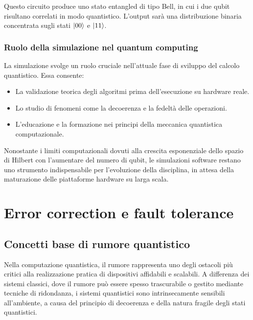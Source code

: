 \documentclass[a4paper,12pt]{report}
\theoremstyle{plain}
\begin{document}
Questo circuito produce uno stato entangled di tipo Bell, in cui i due qubit risultano correlati in modo quantistico. L'output sarà una distribuzione binaria concentrata sugli stati $\ket{00}$ e $\ket{11}$.

\subsection{Ruolo della simulazione nel quantum computing}

La simulazione svolge un ruolo cruciale nell'attuale fase di sviluppo del calcolo quantistico. Essa consente:

\begin{itemize}
  \item La validazione teorica degli algoritmi prima dell'esecuzione su hardware reale.
  \item Lo studio di fenomeni come la decoerenza e la fedeltà delle operazioni.
  \item L'educazione e la formazione nei principi della meccanica quantistica computazionale.
\end{itemize}

Nonostante i limiti computazionali dovuti alla crescita esponenziale dello spazio di Hilbert con l'aumentare del numero di qubit, le simulazioni software restano uno strumento indispensabile per l'evoluzione della disciplina, in attesa della maturazione delle piattaforme hardware su larga scala.



\chapter{Error correction e fault tolerance}
\section{Concetti base di rumore quantistico}
Nella computazione quantistica, il rumore rappresenta uno degli ostacoli più critici alla realizzazione pratica di dispositivi affidabili e scalabili. A differenza dei sistemi classici, dove il rumore può essere spesso trascurabile o gestito mediante tecniche di ridondanza, i sistemi quantistici sono intrinsecamente sensibili all'ambiente, a causa del principio di decoerenza e della natura fragile degli stati quantistici.
\end{document}
